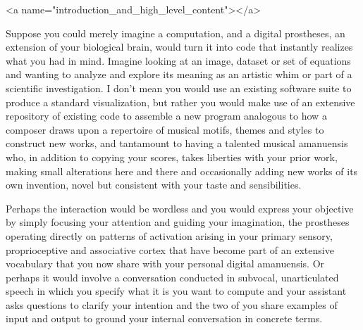 
\rawhtml
<a name="introduction_and_high_level_content"></a>
\endrawhtml
{}


Suppose you could merely imagine a computation, and a digital prostheses, an extension of your biological brain, would turn it into code that instantly realizes what you had in mind. Imagine looking at an image, dataset or set of equations and wanting to analyze and explore its meaning as an artistic whim or part of a scientific investigation. I don't mean you would use an existing software suite to produce a standard visualization, but rather you would make use of an extensive repository of existing code to assemble a new program analogous to how a composer draws upon a repertoire of musical motifs, themes and styles to construct new works, and tantamount to having a talented musical amanuensis who, in addition to copying your scores, takes liberties with your prior work, making small alterations here and there and occasionally adding new works of its own invention, novel but consistent with your taste and sensibilities.

Perhaps the interaction would be wordless and you would express your objective by simply focusing your attention and guiding your imagination, the prostheses operating directly on patterns of activation arising in your primary sensory, proprioceptive and associative cortex that have become part of an extensive vocabulary that you now share with your personal digital amanuensis. Or perhaps it would involve a conversation conducted in subvocal, unarticulated speech in which you specify what it is you want to compute and your assistant asks questions to clarify your intention and the two of you share examples of input and output to ground your internal conversation in concrete terms. 

